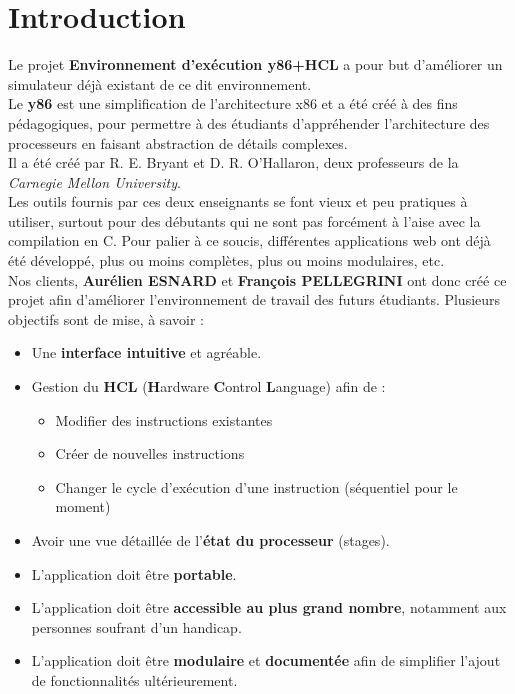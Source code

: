 \documentclass[french]{article}
\begin{document}
\tableofcontents
\newpage

\section{Introduction}

Le projet \textbf{Environnement d'exécution y86+HCL} a pour but d'améliorer un simulateur déjà existant de ce dit environnement. \\

Le \textbf{y86} est une simplification de l'architecture x86 et a été créé à des fins pédagogiques, pour permettre à des étudiants d'appréhender l'architecture des processeurs en faisant abstraction de détails complexes. \\
Il a été créé par R. E. Bryant et D. R. O'Hallaron, deux professeurs de la \textit{Carnegie Mellon University}. \\

Les outils \cite{standalone-app} fournis par ces deux enseignants se font vieux et peu pratiques à utiliser, surtout pour des débutants qui ne sont pas forcément à l'aise avec la compilation en C. Pour palier à ce soucis, différentes applications web ont déjà été développé, plus ou moins complètes, plus ou moins modulaires, etc.\\

Nos clients, \textbf{Aurélien ESNARD} et \textbf{François PELLEGRINI} ont donc créé ce projet afin d'améliorer l'environnement de travail des futurs étudiants. Plusieurs objectifs sont de mise, à savoir : 

\begin{itemize}
    \item Une \textbf{interface intuitive} et agréable.
    \item Gestion du \textbf{HCL} (\textbf{H}ardware \textbf{C}ontrol \textbf{L}anguage) afin de :
    \begin{itemize}
        \item Modifier des instructions existantes
        \item Créer de nouvelles instructions
        \item Changer le cycle d'exécution d'une instruction (séquentiel pour le moment)
    \end{itemize}{}
    \item Avoir une vue détaillée de l'\textbf{état du processeur} (stages).
    \item L'application doit être \textbf{portable}.
    \item L'application doit être \textbf{accessible au plus grand nombre}, notamment aux personnes soufrant d'un handicap.
    \item L'application doit être \textbf{modulaire} et \textbf{documentée} afin de simplifier l'ajout de fonctionnalités ultérieurement.
\end{itemize}
\end{document}
